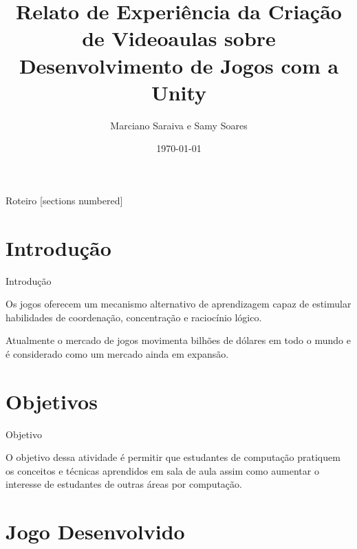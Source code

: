 \documentclass[10pt]{beamer}
\title{Relato de Experiência da Criação de Videoaulas sobre Desenvolvimento de Jogos com a Unity}
\date{\today}
\author{Marciano Saraiva e Samy Soares}
\institute{Universidade Federal do Cear\'a - Campus de Quixad\'a}
\begin{document}
\maketitle

\begin{frame}{Roteiro}
	[sections numbered]
	\tableofcontents[hideallsubsections]
\end{frame}

\section{Introdu\c{c}\~ao}

\begin{frame}{Introdução}

Os jogos oferecem um mecanismo alternativo de aprendizagem capaz de estimular habilidades de coordenação,
concentração e raciocínio lógico.

Atualmente o mercado de jogos movimenta bilhões de dólares em todo o mundo e é considerado como um mercado ainda em expansão.

\end{frame}


\section{Objetivos}

\begin{frame}{Objetivo}

O objetivo dessa atividade é permitir que estudantes de computação pratiquem os conceitos e técnicas aprendidos em sala de aula assim como aumentar o interesse de
estudantes de outras áreas por computação.

\end{frame}

\section{Jogo Desenvolvido}
\end{document}
